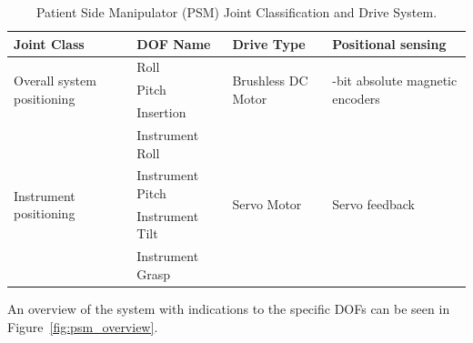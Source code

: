 \begin{table}[htb!] %
    \centering
    \caption{Patient Side Manipulator (PSM) Joint Classification and Drive System.}
    \label{tab:psm_dofs}
    \setlength{\tabcolsep}{4pt} %
    \begin{tabular}{|p{3.0cm}|l|l|p{4.5cm}|} %
    \hline
    \textbf{Joint Class} & \textbf{DOF Name} & \textbf{Drive Type} & \textbf{Positional sensing} \\
    \hline
    \multirow{3}{3.0cm}{\centering Overall system positioning} & Roll & \multirow{3}{*}{Brushless DC Motor} & \multirow{3}{4.5cm}{\centering 12-bit absolute magnetic encoders} \\
    & Pitch & & \\
    & Insertion & & \\
    \hline
    \multirow{4}{3.0cm}{\centering Instrument positioning} & Instrument Roll & \multirow{4}{*}{Servo Motor} & \multirow{4}{4.5cm}{\centering Servo feedback} \\
    & Instrument Pitch & & \\
    & Instrument Tilt & & \\
    & Instrument Grasp & & \\
    \hline
    \end{tabular}
\end{table}


An overview of the system with indications to the specific DOFs can be seen in Figure~\ref{fig:psm_overview}.


